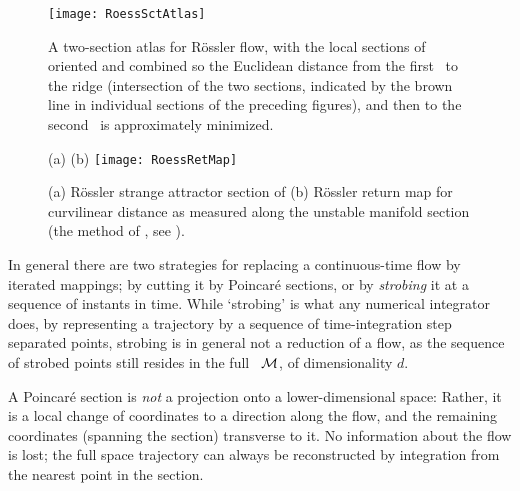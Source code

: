 \begin{figure}%
\begin{center}
  \texttt{[image: RoessSctAtlas]}
\end{center}
  \caption{
  A two-section atlas for R\"ossler flow, with the local sections of
   oriented and combined so the
  Euclidean distance from the first \template\ to the ridge (intersection
  of the two sections, indicated by the brown line in individual sections
  of the preceding figures), and then to the second \template\ is
  approximately minimized.
  } \label{fig:RoessSctAtlas}
\end{figure}

\begin{figure}
\begin{center}
(a) %
(b) \texttt{[image: RoessRetMap]}
\end{center}
  \caption{
(a) R\"ossler strange attractor section of 
(b) R\"ossler return map for curvilinear distance as measured
along the unstable manifold section (the method of
, see ).
  }
\label{fig:RoessRetMap}
\end{figure}

In general there are two strategies for replacing a continuous-time flow
by iterated mappings; by cutting it by Poincar\'e sections, or by
\emph{strobing} it at a sequence of instants in time. While
`strobing' is what any numerical integrator does, by representing a
trajectory by a sequence of time-integration step separated points,
strobing is in general not a reduction of a flow, as the sequence of
strobed points still resides in the full \statesp\ ${\cal M}$, of
dimensionality $d$.

A Poincar\'e section is {\em not} a projection onto a lower-dimensional
space: Rather, it is a local change of coordinates to a direction along
the flow, and the remaining coordinates (spanning the section) transverse
to it. No information about the flow is lost; the full space trajectory
can always be reconstructed by integration from the nearest point in the
section.


